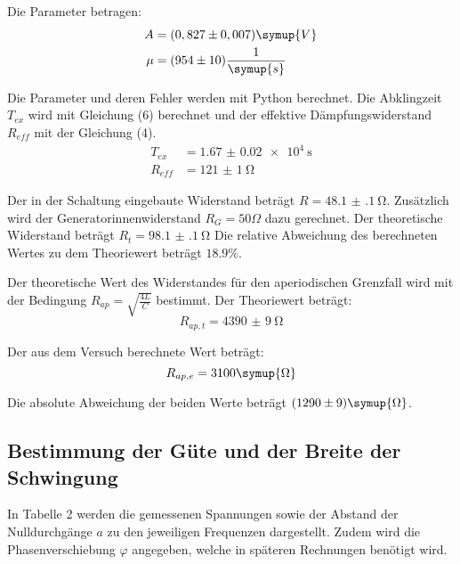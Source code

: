 Die Parameter betragen:
\begin{align*}
  A &= (0,827 \pm 0,007) \symup{V} \\
  \mu &= (954 \pm 10)\frac{1}{\symup{s}}
\end{align*}

Die Parameter und deren Fehler werden mit Python berechnet.
Die Abklingzeit $T_{ex}$ wird mit Gleichung (6) berechnet und der effektive Dämpfungswiderstand $R_{eff}$ mit
der Gleichung (4).
\begin{align*}
T_{ex} &= \SI{1.67(2)e4}{\second} \\
R_{eff} &= \SI{121(1)}{\ohm}
\end{align*}

Der in der Schaltung eingebaute Widerstand beträgt $R = \SI{48.1(1)}{\ohm}$. Zusätzlich wird der
Generatorinnenwiderstand $R_G = 50 \Omega$ dazu gerechnet. Der theoretische Widerstand beträgt $R_t = \SI{98.1(1)}{\ohm}$
Die relative Abweichung des berechneten Wertes zu dem Theoriewert beträgt $18.9\%$.


Der theoretische Wert des Widerstandes für den aperiodischen Grenzfall wird mit der Bedingung
$R_{ap} =\sqrt{\frac{4L}{C}}$ bestimmt. Der Theoriewert beträgt:
\begin{equation*}
  R_{ap,t} = \SI{4390(9)}{\ohm}
\end{equation*}

Der aus dem Versuch berechnete Wert beträgt:
\begin{equation*}
  R_{ap,e} = 3100 \symup{\Omega}
\end{equation*}

Die absolute Abweichung der beiden Werte beträgt $(1290 \pm 9) \symup{\Omega}$.



\subsection{Bestimmung der Güte und der Breite der Schwingung}

In Tabelle 2 werden die gemessenen Spannungen sowie der Abstand der Nulldurchgänge $a$ zu den jeweiligen
Frequenzen dargestellt. Zudem wird die Phasenverschiebung $\varphi$ angegeben, welche in späteren Rechnungen
benötigt wird.

